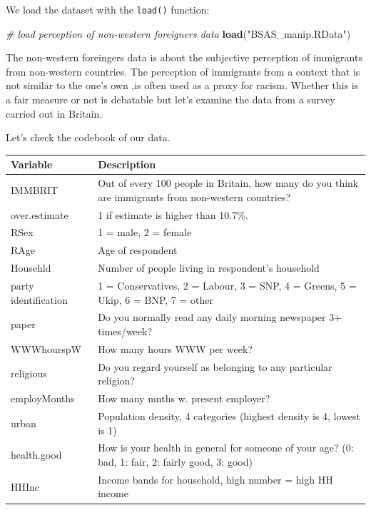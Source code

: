 \documentclass[]{article}
\newenvironment{Shaded}{\begin{snugshade}}{\end{snugshade}}
\newcommand{\KeywordTok}[1]{\textcolor[rgb]{0.13,0.29,0.53}{\textbf{#1}}}
\newcommand{\StringTok}[1]{\textcolor[rgb]{0.31,0.60,0.02}{#1}}
\newcommand{\CommentTok}[1]{\textcolor[rgb]{0.56,0.35,0.01}{\textit{#1}}}
\newcommand{\NormalTok}[1]{#1}
\theoremstyle{definition}
\theoremstyle{definition}
\theoremstyle{definition}
\theoremstyle{remark}
\begin{document}
We load the dataset with the \texttt{load()} function:

\begin{Shaded}
\begin{Highlighting}[]
\CommentTok{# load perception of non-western foreigners data}
\KeywordTok{load}\NormalTok{(}\StringTok{"BSAS_manip.RData"}\NormalTok{)}
\end{Highlighting}
\end{Shaded}

The non-western foreingers data is about the subjective perception of
immigrants from non-western countries. The perception of immigrants from
a context that is not similar to the one's own ,is often used as a proxy
for racism. Whether this is a fair measure or not is debatable but let's
examine the data from a survey carried out in Britain.

Let's check the codebook of our data.

\begin{tabular}{l|l}
\hline
Variable & Description\\
\hline
IMMBRIT & Out of every 100 people in Britain, how many do you think are immigrants from non-western countries?\\
\hline
over.estimate & 1 if estimate is higher than 10.7\%.\\
\hline
RSex & 1 = male, 2 = female\\
\hline
RAge & Age of respondent\\
\hline
Househld & Number of people living in respondent's household\\
\hline
party identification & 1 = Conservatives, 2 = Labour, 3 = SNP, 4 = Greens, 5 = Ukip, 6 = BNP, 7 = other\\
\hline
paper & Do you normally read any daily morning newspaper 3+ times/week?\\
\hline
WWWhourspW & How many hours WWW per week?\\
\hline
religious & Do you regard yourself as belonging to any particular religion?\\
\hline
employMonths & How many mnths w. present employer?\\
\hline
urban & Population density, 4 categories (highest density is 4, lowest is 1)\\
\hline
health.good & How is your health in general for someone of your age? (0: bad, 1: fair, 2: fairly good, 3: good)\\
\hline
HHInc & Income bands for household, high number = high HH income\\
\hline
\end{tabular}
\end{document}

